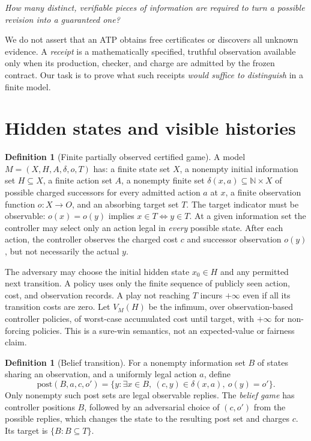 \documentclass[11pt,letterpaper]{article}
\theoremstyle{definition}
\newtheorem{definition}[theorem]{Definition}
\theoremstyle{remark}
\newcommand{\N}{\mathbb{N}}
\begin{document}
\begin{center}\emph{How many distinct, verifiable pieces of information are required to turn a possible revision into a guaranteed one?}\end{center}

We do not assert that an ATP obtains free certificates or discovers all unknown evidence. A \emph{receipt} is a mathematically specified, truthful observation available only when its production, checker, and charge are admitted by the frozen contract. Our task is to prove what such receipts \emph{would suffice to distinguish} in a finite model.

\section{Hidden states and visible histories}
\begin{definition}[Finite partially observed certified game]\label{def:pog}
A model $M=(X,H,A,\delta,o,T)$ has: a finite state set $X$, a nonempty initial information set $H\subseteq X$, a finite action set $A$, a nonempty finite set $\delta(x,a)\subseteq\N\times X$ of possible charged successors for every admitted action $a$ at $x$, a finite observation function $o:X\to O$, and an absorbing target set $T$. The target indicator must be observable: $o(x)=o(y)$ implies $x\in T\Leftrightarrow y\in T$. At a given information set the controller may select only an action legal in \emph{every} possible state. After each action, the controller observes the charged cost $c$ and successor observation $o(y)$, but not necessarily the actual $y$.
\end{definition}

The adversary may choose the initial hidden state $x_0\in H$ and any permitted next transition. A policy uses only the finite sequence of publicly seen action, cost, and observation records. A play not reaching $T$ incurs $+\infty$ even if all its transition costs are zero. Let $V_M(H)$ be the infimum, over observation-based controller policies, of worst-case accumulated cost until target, with $+\infty$ for non-forcing policies. This is a sure-win semantics, not an expected-value or fairness claim.

\begin{definition}[Belief transition]
For a nonempty information set $B$ of states sharing an observation, and a uniformly legal action $a$, define
\[
  \mathrm{post}(B,a,c,o')=
  \{y: \exists x\in B,\ (c,y)\in\delta(x,a),\ o(y)=o'\}.
\]
Only nonempty such post sets are legal observable replies. The \emph{belief game} has controller positions $B$, followed by an adversarial choice of $(c,o')$ from the possible replies, which changes the state to the resulting post set and charges $c$. Its target is $\{B:B\subseteq T\}$.
\end{definition}
\end{document}
